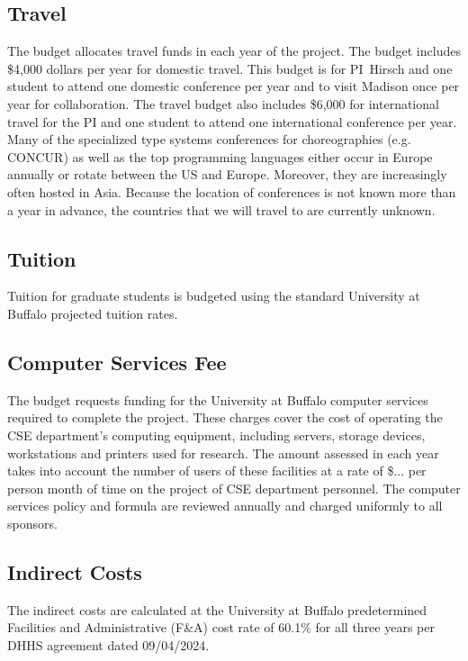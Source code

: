 \subsection*{Travel}
The budget allocates travel funds in each year of the project. 
The budget includes \$4,000 dollars per year for domestic travel.
This budget is for PI~Hirsch and one student to attend one domestic conference per year and to visit Madison once per year for collaboration.
The travel budget also includes \$6,000 for international travel for the PI and one student to attend one international conference per year.
Many of the specialized type systems conferences for choreographies (e.g. CONCUR) as well as the top programming languages either occur in Europe annually or rotate between the US and Europe.
Moreover, they are increasingly often hosted in Asia.
Because the location of conferences is not known more than a year in advance, the countries that we will travel to are currently unknown.

\subsection*{Tuition}
Tuition for graduate students is budgeted using the standard University at Buffalo projected tuition rates.

\subsection*{Computer Services Fee}
The budget requests funding for the University at Buffalo computer services required to complete the project.
These charges cover the cost of operating the CSE department's computing equipment, including servers, storage devices, workstations and printers used for research.
The amount assessed in each year takes into account the number of users of these facilities at a rate of \$... per person month of time on the project of CSE department personnel.
The computer services policy and formula are reviewed annually and charged uniformly to all sponsors. 

\subsection*{Indirect Costs}

The indirect costs are calculated at the University at Buffalo predetermined Facilities and Administrative (F\&A) cost rate of  60.1\% for all three years per DHHS agreement dated 09/04/2024.




